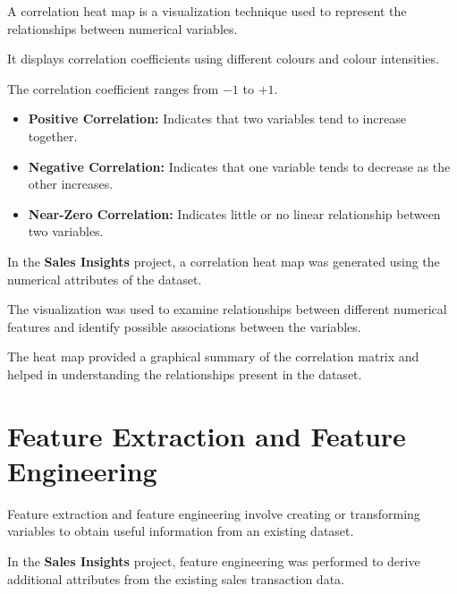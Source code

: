 \documentclass[12pt,a4paper]{report}
\begin{document}
A correlation heat map is a
visualization technique used to
represent the relationships
between numerical variables.

It displays correlation coefficients
using different colours and
colour intensities.

The correlation coefficient
ranges from $-1$ to $+1$.

\begin{itemize}

    \item \textbf{Positive Correlation:}
    Indicates that two variables
    tend to increase together.

    \item \textbf{Negative Correlation:}
    Indicates that one variable
    tends to decrease as the
    other increases.

    \item \textbf{Near-Zero Correlation:}
    Indicates little or no
    linear relationship between
    two variables.

\end{itemize}

In the \textbf{Sales Insights}
project, a correlation heat map
was generated using the numerical
attributes of the dataset.

The visualization was used to
examine relationships between
different numerical features
and identify possible associations
between the variables.

The heat map provided a
graphical summary of the
correlation matrix and helped
in understanding the relationships
present in the dataset.

\endgroup



\chapter{Feature Extraction and Feature Engineering}

\begingroup
\fontsize{14}{21}\selectfont

Feature extraction and feature engineering
involve creating or transforming variables
to obtain useful information from an
existing dataset.

In the \textbf{Sales Insights} project,
feature engineering was performed to
derive additional attributes from
the existing sales transaction data.
\end{document}
